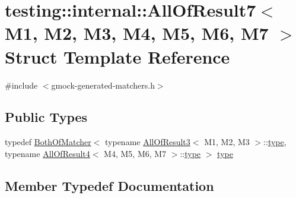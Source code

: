 \hypertarget{structtesting_1_1internal_1_1_all_of_result7}{}\section{testing\+:\+:internal\+:\+:All\+Of\+Result7$<$ M1, M2, M3, M4, M5, M6, M7 $>$ Struct Template Reference}
\label{structtesting_1_1internal_1_1_all_of_result7}


{\ttfamily \#include $<$gmock-\/generated-\/matchers.\+h$>$}

\subsection*{Public Types}
\begin{DoxyCompactItemize}
\item 
typedef \hyperlink{classtesting_1_1internal_1_1_both_of_matcher}{Both\+Of\+Matcher}$<$ typename \hyperlink{structtesting_1_1internal_1_1_all_of_result3}{All\+Of\+Result3}$<$ M1, M2, M3 $>$\+::\hyperlink{structtesting_1_1internal_1_1_all_of_result7_a47ab0d670258434b0e65530591948e8c}{type}, typename \hyperlink{structtesting_1_1internal_1_1_all_of_result4}{All\+Of\+Result4}$<$ M4, M5, M6, M7 $>$\+::\hyperlink{structtesting_1_1internal_1_1_all_of_result7_a47ab0d670258434b0e65530591948e8c}{type} $>$ \hyperlink{structtesting_1_1internal_1_1_all_of_result7_a47ab0d670258434b0e65530591948e8c}{type}
\end{DoxyCompactItemize}


\subsection{Member Typedef Documentation}
\mbox{\label{structtesting_1_1internal_1_1_all_of_result7_a47ab0d670258434b0e65530591948e8c}} 
